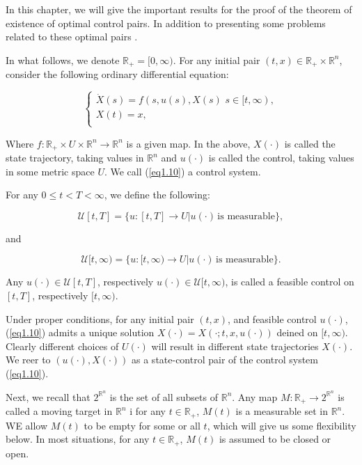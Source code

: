 
In this chapter, we will give the important results for the proof of the 
theorem of existence of optimal control pairs. In addition to presenting some 
problems related to these optimal pairs \cite{Yong2015}.

In what follows, we denote $\mathbb{R}_{+}=[0,\infty)$. For any initial pair 
$(t,x)\in \mathbb{R}_{+}\times \mathbb{R}^n$, consider the following ordinary 
differential equation:

\begin{equation}\label{eq1.10}
    \left\{ 
        \begin{array}{l}
            \dot{X}(s)=f(s,u(s),X(s)\,\,s\in [t,\infty), \\
            X(t)=x,\\
        \end{array}
        \right.
\end{equation}

Where $f:\mathbb{R}_{+}\times U\times \mathbb{R}^n\rightarrow \mathbb{R}^n$ is 
a given map. In the above, $X(\cdot)$ is called the state trajectory, taking 
values in $\mathbb{R}^n$ and $u(\cdot)$ is called the control, taking values in 
some metric space $U$. We call (\ref{eq1.10}) a control system.

For any $0\leq t<T<\infty$, we define the following:

$$\mathcal{U}[t,T]=\{u:[t,T]\rightarrow U | u(\cdot)\,\mbox{is measurable} \},$$

and 


$$
    \mathcal{U}[t,\infty)=
        \{u:[t,\infty)\rightarrow U | u(\cdot)\,
        \mbox{is  measurable} \}.
$$

Any $u(\cdot)\in \mathcal{U}[t,T]$, respectively 
$
    u(\cdot)\in 
    \mathcal{U}[t,\infty)
$, is called a feasible control on $[t,T]$, respectively $[t,\infty)$. 

Under proper conditions, for any initial pair $(t,x)$, and feasible control 
$u(\cdot)$, (\ref{eq1.10}) admits a unique solution 
$X(\cdot)=X(\cdot;t,x,u(\cdot))$ deined on $[t,\infty)$. Clearly different 
choices of $U(\cdot)$ will result in different state trajectories $X(\cdot)$. 
We reer to $(u(\cdot),X(\cdot))$ as a state-control pair of the control system 
(\ref{eq1.10}).

Next, we recall that $2^{\mathbb{R}^n}$ is the set of all subsets of 
$\mathbb{R}^n$. Any map $M:\mathbb{R}_{+}\rightarrow 2^{\mathbb{R}^n}$ is 
called a moving target in $\mathbb{R}^n$ i for any $t\in \mathbb{R}_{+}$, 
$M(t)$ is a measurable set in $\mathbb{R}^n$. WE allow $M(t)$ to be empty for 
some or all $t$, which will give us some flexibility below. In most situations, 
for any $t\in\mathbb{R}_{+}$, $M(t)$ is assumed to be closed or open.

